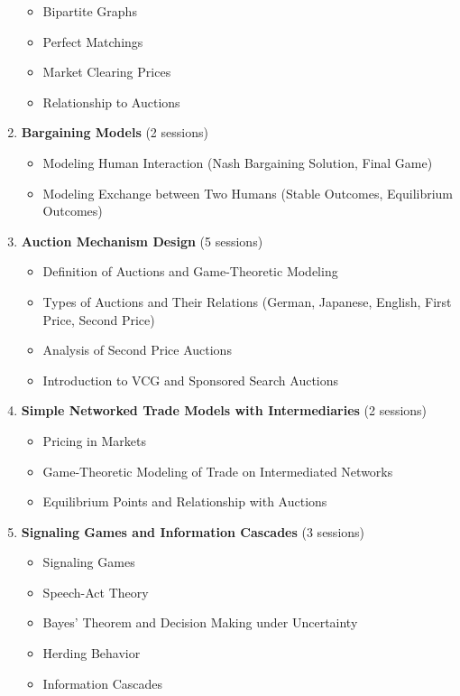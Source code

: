 \documentclass[12pt]{article}
\begin{document}
\begin{enumerate}
\begin{itemize}
        \item Bipartite Graphs
        \item Perfect Matchings
        \item Market Clearing Prices
        \item Relationship to Auctions
    \end{itemize}
    \item \textbf{Bargaining Models} (2 sessions)
    \begin{itemize}
        \item Modeling Human Interaction (Nash Bargaining Solution, Final Game)
        \item Modeling Exchange between Two Humans (Stable Outcomes, Equilibrium Outcomes)
    \end{itemize}
    \item \textbf{Auction Mechanism Design} (5 sessions)
    \begin{itemize}
        \item Definition of Auctions and Game-Theoretic Modeling
        \item Types of Auctions and Their Relations (German, Japanese, English, First Price, Second Price)
        \item Analysis of Second Price Auctions
        \item Introduction to VCG and Sponsored Search Auctions
    \end{itemize}
    \item \textbf{Simple Networked Trade Models with Intermediaries} (2 sessions)
    \begin{itemize}
        \item Pricing in Markets
        \item Game-Theoretic Modeling of Trade on Intermediated Networks
        \item Equilibrium Points and Relationship with Auctions
    \end{itemize}
    \item \textbf{Signaling Games and Information Cascades} (3 sessions)
    \begin{itemize}
        \item Signaling Games
        \item Speech-Act Theory
        \item Bayes' Theorem and Decision Making under Uncertainty
        \item Herding Behavior
        \item Information Cascades
    \end{itemize}

\end{enumerate}
\end{document}
